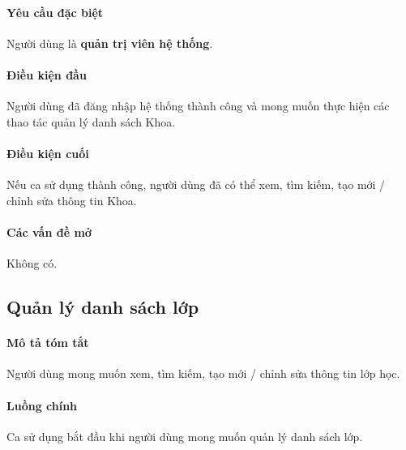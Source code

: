 \documentclass[./../main.tex]{subfiles}
\begin{document}
\paragraph*{Yêu cầu đặc biệt}

Người dùng là \textbf{quản trị viên hệ thống}.

\paragraph*{Điều kiện đầu}

Người dùng đã đăng nhập hệ thống thành công và mong muốn thực hiện các thao tác quản lý danh sách Khoa.

\paragraph*{Điều kiện cuối}

Nếu ca sử dụng thành công, người dùng đã có thể xem, tìm kiếm, tạo mới / chỉnh sửa thông tin Khoa.

\paragraph*{Các vấn đề mở}

Không có.

\subsection{Quản lý danh sách lớp}

\paragraph*{Mô tả tóm tắt}

Người dùng mong muốn xem, tìm kiếm, tạo mới / chỉnh sửa thông tin lớp học.

\paragraph*{Luồng chính} Ca sử dụng bắt đầu khi người dùng mong muốn quản lý danh sách lớp.
\end{document}
